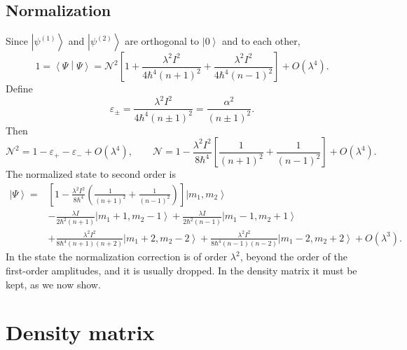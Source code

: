 \documentclass[aps,pra,onecolumn,notitlepage,nofootinbib,11pt]{revtex4-2}
\newcommand{\ket}[1]{\left|#1\right\rangle}
\newcommand{\braket}[2]{\left\langle#1\middle|#2\right\rangle}
\newcommand{\epsp}{\varepsilon_{+}}
\newcommand{\epsm}{\varepsilon_{-}}
\begin{document}
\subsection{Normalization}

Since $\ket{\psi^{(1)}}$ and $\ket{\psi^{(2)}}$ are orthogonal to $\ket0$ and to each
other,
\begin{equation}
1=\braket\Psi\Psi=\mathcal{N}^{2}\left[1+\frac{\lambda^{2}I^{2}}{4\hbar^{4}(n+1)^{2}}
+\frac{\lambda^{2}I^{2}}{4\hbar^{4}(n-1)^{2}}\right]+O(\lambda^{4}).
\end{equation}
Define
\begin{equation}
\varepsilon_{\pm}=\frac{\lambda^{2}I^{2}}{4\hbar^{4}(n\pm1)^{2}}=\frac{\alpha^{2}}{(n\pm1)^{2}} .
\label{eq:eps}
\end{equation}
Then
\begin{equation}
\mathcal{N}^{2}=1-\epsp-\epsm+O(\lambda^{4}),\qquad
\mathcal{N}=1-\frac{\lambda^{2}I^{2}}{8\hbar^{4}}\left[\frac{1}{(n+1)^{2}}
+\frac{1}{(n-1)^{2}}\right]+O(\lambda^{4}).
\label{eq:N}
\end{equation}
The normalized state to second order is
\begin{align}
\ket\Psi={}&\left[1-\frac{\lambda^{2}I^{2}}{8\hbar^{4}}\left(\frac{1}{(n+1)^{2}}
+\frac{1}{(n-1)^{2}}\right)\right]\ket{m_{1},m_{2}}\nonumber\\
&-\frac{\lambda I}{2\hbar^{2}(n+1)}\ket{m_{1}+1,m_{2}-1}
+\frac{\lambda I}{2\hbar^{2}(n-1)}\ket{m_{1}-1,m_{2}+1}\nonumber\\
&+\frac{\lambda^{2}I^{2}}{8\hbar^{4}(n+1)(n+2)}\ket{m_{1}+2,m_{2}-2}
+\frac{\lambda^{2}I^{2}}{8\hbar^{4}(n-1)(n-2)}\ket{m_{1}-2,m_{2}+2}+O(\lambda^{3}).
\label{eq:state}
\end{align}
In the state the normalization correction is of order $\lambda^{2}$, beyond the order
of the first-order amplitudes, and it is usually dropped. In the density matrix it
must be kept, as we now show.

\section{Density matrix}
\end{document}
